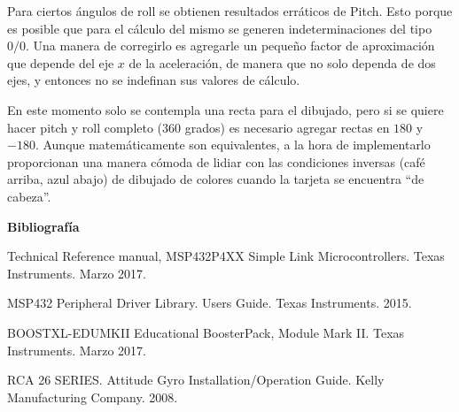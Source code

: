 Para ciertos ángulos de roll se obtienen resultados erráticos de Pitch. Esto
porque es posible que para el cálculo del mismo se generen indeterminaciones del
tipo $0/0$. Una manera de corregirlo es agregarle un pequeño factor de
aproximación que depende del eje $x$ de la aceleración, de manera que no solo
dependa de dos ejes, y entonces no se indefinan sus valores de cálculo.

En este momento solo se contempla una recta para el dibujado, pero si se quiere
hacer pitch y roll completo ($360$ grados) es necesario agregar rectas en $180$
y $-180$. Aunque matemáticamente son equivalentes, a la hora de implementarlo
proporcionan una manera cómoda de lidiar con las condiciones inversas (café
arriba, azul abajo) de dibujado de colores cuando la tarjeta se encuentra ``de
cabeza''.


\textbf{ Bibliografía}

Technical Reference manual, MSP432P4XX Simple Link Microcontrollers. Texas Instruments. Marzo 2017.

MSP432 Peripheral Driver Library. Users Guide. Texas Instruments. 2015.

BOOSTXL-EDUMKII Educational BoosterPack, Module Mark II. Texas Instruments. Marzo 2017.

RCA 26 SERIES. Attitude Gyro Installation/Operation Guide. Kelly Manufacturing Company. 2008. 

%
%
